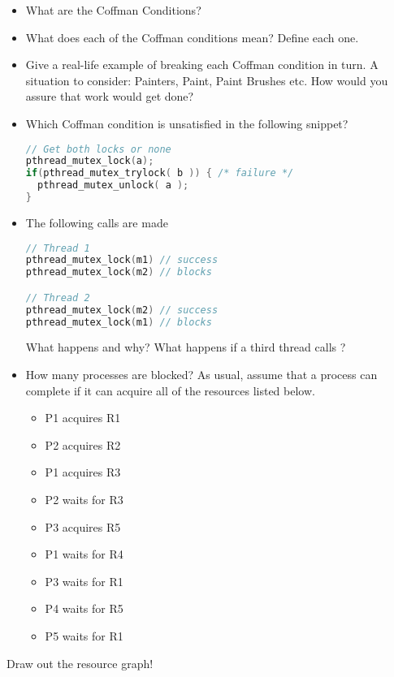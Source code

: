 \begin{itemize}
\item
  What are the Coffman Conditions?
\item
  What does each of the Coffman conditions mean? Define each one.
\item
  Give a real-life example of breaking each Coffman condition in turn. A situation to consider: Painters, Paint, Paint Brushes etc. How would you assure that work would get done?
\item
  Which Coffman condition is unsatisfied in the following snippet?

\begin{lstlisting}[language=C]
// Get both locks or none
pthread_mutex_lock(a);
if(pthread_mutex_trylock( b )) { /* failure */
  pthread_mutex_unlock( a );
}
\end{lstlisting}
\item
  The following calls are made

\begin{lstlisting}[language=c]
// Thread 1
pthread_mutex_lock(m1) // success
pthread_mutex_lock(m2) // blocks

// Thread 2
pthread_mutex_lock(m2) // success
pthread_mutex_lock(m1) // blocks
\end{lstlisting}

  What happens and why? What happens if a third thread calls
   ?
\item
  How many processes are blocked? As usual, assume that a process can complete if it can acquire all of the resources listed
  below.

  \begin{itemize}
  \tightlist
  \item
    P1 acquires R1
  \item
    P2 acquires R2
  \item
    P1 acquires R3
  \item
    P2 waits for R3
  \item
    P3 acquires R5
  \item
    P1 waits for R4
  \item
    P3 waits for R1
  \item
    P4 waits for R5
  \item
    P5 waits for R1
  \end{itemize}
\end{itemize}

Draw out the resource graph!



